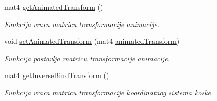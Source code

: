 \begin{DoxyCompactItemize}
mat4 \hyperlink{classmodel_1_1Bone_a2fc96bf7f7ce0e061ae3b4ada72ed9b7}{get\+Animated\+Transform} ()
\begin{DoxyCompactList}\small\item\em Funkcija vraca matricu transformacije animacije. \end{DoxyCompactList}\item 
void \hyperlink{classmodel_1_1Bone_afe6c5180dae41b82ffcaaf8e0fbb756d}{set\+Animated\+Transform} (mat4 \hyperlink{classmodel_1_1Bone_a72f5c45330effbe7a68b7984fcf2250e}{animated\+Transform})
\begin{DoxyCompactList}\small\item\em Funkcija postavlja matricu transformacije animacije. \end{DoxyCompactList}\item 
mat4 \hyperlink{classmodel_1_1Bone_a96a871fa5d08586c5ba8720bc6de72e1}{get\+Inverse\+Bind\+Transform} ()
\begin{DoxyCompactList}\small\item\em Funkcija vraca matricu transformacije koordinatnog sistema koske. \end{DoxyCompactList}\end{DoxyCompactItemize}
